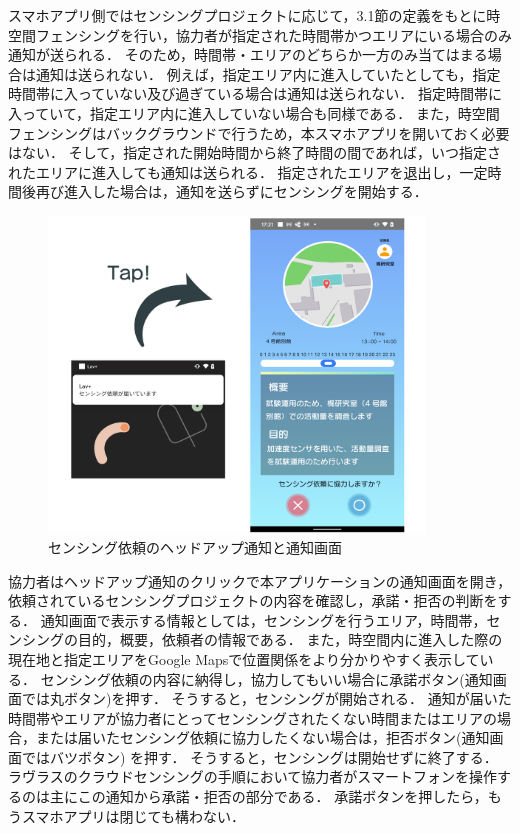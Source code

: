 スマホアプリ側ではセンシングプロジェクトに応じて，3.1節の定義をもとに時空間フェンシングを行い，協力者が指定された時間帯かつエリアにいる場合のみ通知が送られる．
そのため，時間帯・エリアのどちらか一方のみ当てはまる場合は通知は送られない．
例えば，指定エリア内に進入していたとしても，指定時間帯に入っていない及び過ぎている場合は通知は送られない．
指定時間帯に入っていて，指定エリア内に進入していない場合も同様である．
また，時空間フェンシングはバックグラウンドで行うため，本スマホアプリを開いておく必要はない．
そして，指定された開始時間から終了時間の間であれば，いつ指定されたエリアに進入しても通知は送られる．
指定されたエリアを退出し，一定時間後再び進入した場合は，通知を送らずにセンシングを開始する．

\begin{figure}[H]
  \centering
  \includegraphics[width=100mm]{fig2.png}
  \caption{センシング依頼のヘッドアップ通知と通知画面}
  \label{fig:2}
\end{figure}

協力者はヘッドアップ通知のクリックで本アプリケーションの通知画面を開き，依頼されているセンシングプロジェクトの内容を確認し，承諾・拒否の判断をする．
通知画面で表示する情報としては，センシングを行うエリア，時間帯，センシングの目的，概要，依頼者の情報である．
また，時空間内に進入した際の現在地と指定エリアをGoogle Mapsで位置関係をより分かりやすく表示している．
センシング依頼の内容に納得し，協力してもいい場合に承諾ボタン(通知画面では丸ボタン)を押す．
そうすると，センシングが開始される．
通知が届いた時間帯やエリアが協力者にとってセンシングされたくない時間またはエリアの場合，または届いたセンシング依頼に協力したくない場合は，拒否ボタン(通知画面ではバツボタン) を押す．
そうすると，センシングは開始せずに終了する．
ラヴラスのクラウドセンシングの手順において協力者がスマートフォンを操作するのは主にこの通知から承諾・拒否の部分である．
承諾ボタンを押したら，もうスマホアプリは閉じても構わない．


